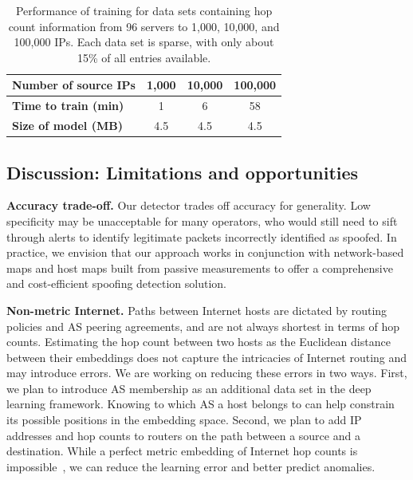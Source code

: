 \begin{table}[]
	\centering
	\begin{tabular}{l|c|c|c}
		{\bf Number of source IPs}   & 1,000 & 10,000 & 100,000 \\
		\hline
		{\bf Time to train (min)} &  1 & 6 & 58\\
		\hline
		{\bf Size of model (MB)} & 4.5 & 4.5 & 4.5\\
	\end{tabular}
	\caption{Performance of training for data sets containing hop count information from 96 servers to 1,000, 10,000, and 100,000 IPs. Each data set is sparse, with only about 15\% of all entries available.}
	\label{tab:performance}
\end{table}

\subsection{Discussion: Limitations and opportunities}
\label{spoof:discussion}


{\bf Accuracy trade-off.} Our detector trades off accuracy for generality. Low specificity may be unacceptable for many operators, who would still need to sift through alerts to identify legitimate packets incorrectly identified as spoofed. In practice, we envision that our approach works in conjunction with network-based maps and host maps built from passive measurements to offer a comprehensive and cost-efficient spoofing detection solution.

{\bf Non-metric Internet.}
Paths between Internet hosts are dictated by routing policies and AS peering agreements, and are not always shortest in terms of hop counts. Estimating the hop count between two hosts as the Euclidean distance between their embeddings does not capture the intricacies of Internet routing and may introduce errors. We are working on reducing these errors in two ways. First, we plan to introduce AS membership as an additional data set in the deep learning framework. Knowing to which AS a host belongs to can help constrain its possible positions in the embedding space. Second, we plan to add IP addresses and hop counts to routers on the path between a source and a destination. While a perfect metric embedding of Internet hop counts is impossible~\citep{peerwise}, we can reduce the learning error and better predict anomalies.


